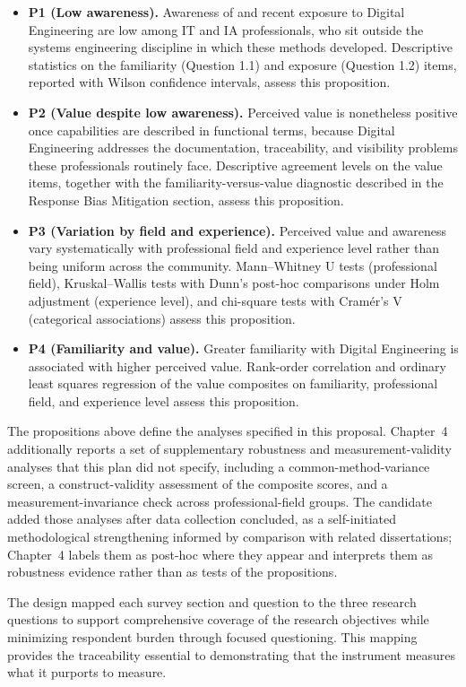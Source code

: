 \begin{itemize}
  \item \textbf{P1 (Low awareness).} Awareness of and recent exposure to Digital Engineering are low among IT and IA professionals, who sit outside the systems engineering discipline in which these methods developed. Descriptive statistics on the familiarity (Question 1.1) and exposure (Question 1.2) items, reported with Wilson confidence intervals, assess this proposition.
  \item \textbf{P2 (Value despite low awareness).} Perceived value is nonetheless positive once capabilities are described in functional terms, because Digital Engineering addresses the documentation, traceability, and visibility problems these professionals routinely face. Descriptive agreement levels on the value items, together with the familiarity-versus-value diagnostic described in the Response Bias Mitigation section, assess this proposition.
  \item \textbf{P3 (Variation by field and experience).} Perceived value and awareness vary systematically with professional field and experience level rather than being uniform across the community. Mann--Whitney U tests (professional field), Kruskal--Wallis tests with Dunn's post-hoc comparisons under Holm adjustment (experience level), and chi-square tests with Cram\'er's V (categorical associations) assess this proposition.
  \item \textbf{P4 (Familiarity and value).} Greater familiarity with Digital Engineering is associated with higher perceived value. Rank-order correlation and ordinary least squares regression of the value composites on familiarity, professional field, and experience level assess this proposition.
\end{itemize}

The propositions above define the analyses specified in this proposal. Chapter~4 additionally reports a set of supplementary robustness and measurement-validity analyses that this plan did not specify, including a common-method-variance screen, a construct-validity assessment of the composite scores, and a measurement-invariance check across professional-field groups. The candidate added those analyses after data collection concluded, as a self-initiated methodological strengthening informed by comparison with related dissertations; Chapter~4 labels them as post-hoc where they appear and interprets them as robustness evidence rather than as tests of the propositions.

The design mapped each survey section and question to the three research questions to support comprehensive coverage of the research objectives while minimizing respondent burden through focused questioning. This mapping provides the traceability essential to demonstrating that the instrument measures what it purports to measure.

